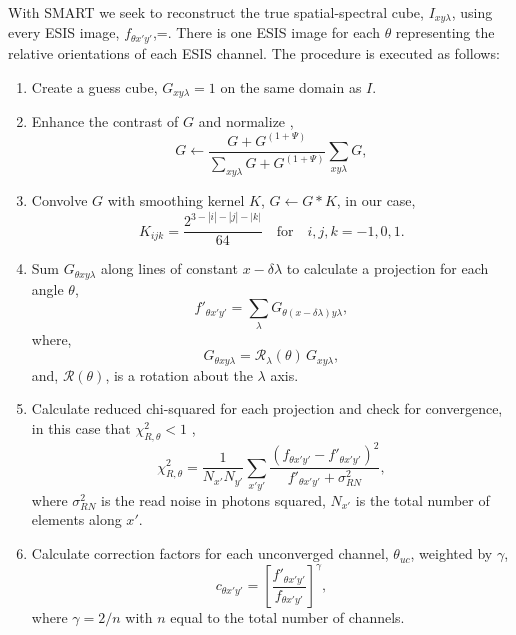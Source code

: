 	With SMART we seek to reconstruct the true spatial-spectral cube, $I_{xy\lambda}$, using every ESIS image, $f_{\theta x'y'}$,=. There is one ESIS image for each $\theta$ representing the relative orientations of each ESIS channel. The procedure is executed as follows:
	\begin{enumerate}
		\item \label{step:guess} Create a guess cube, $G_{xy\lambda} = 1$ on the same domain as $I$. 
		\item \label{step:contrast} Enhance the contrast of $G$ and normalize , 
			\begin{equation}
				G \leftarrow \frac{G+G^{(1+\Psi)}}{\sum_{xy\lambda}G+G^{(1+\Psi)}}\sum_{xy\lambda}G, 
			\end{equation}
		
		\item \label{step:smooth} Convolve $G$ with smoothing kernel $K$, $G \leftarrow G * K$,
		in our case,
			\begin{equation}
			\label{eq:kernel}
				K_{ijk} = \frac{2^{3-|i|-|j|-|k|}}{64} \quad \text{for}\quad i,j,k = -1,0,1.
			\end{equation}
		
		\item \label{step:project} Sum $G_{\theta xy\lambda}$ along lines of constant $x-\delta\lambda$ to calculate a projection for each angle $\theta$,
			\begin{equation}
				f'_{\theta x'y'} = \sum_\lambda G_{\theta(x-\delta\lambda)y\lambda}, 
			\end{equation}
		where,
			\begin{equation}
				G_{\theta xy\lambda} = \mathcal{R}_\lambda(\theta)\,G_{xy\lambda},
			\end{equation} 
		and, $\mathcal{R}(\theta)$, is a rotation about the $\lambda$ axis. 	
		
		\item \label{step:chisquared} Calculate reduced chi-squared for each projection and check for convergence, in this case that $\chi_{R,\theta}^2 < 1$ , 
			\begin{equation}
				\chi_{R,\theta}^2 = \frac{1}{N_{x'} N_{y'}}\sum_{x'y'} \frac{(f_{\theta x'y'}-f'_{\theta x'y'})^2}{f'_{\theta x'y'}+\sigma^2_{RN}},
			\end{equation}
		where $\sigma^2_{RN}$ is the read noise in photons squared, $N_{x'}$ is the total number of elements along $x'$.
		
		\item Calculate correction factors for each unconverged channel, $\theta_{uc}$, weighted by $\gamma$, 
			\begin{equation} \label{eq:correctionfactor}
				c_{\theta x'y'} = \left[\frac{f'_{\theta x'y'}}{f_{\theta x'y'}}\right]^\gamma,
			\end{equation}
		where $\gamma = 2/n$ with $n$ equal to the total number of channels.
		

\end{enumerate}

